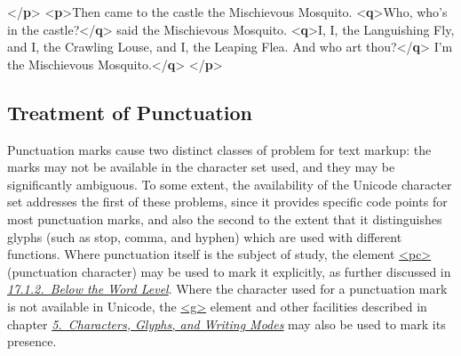 \begin{shaded}
{</\textbf{p}>}\mbox{}\newline 
{<\textbf{p}>}Then came to the castle the Mischievous Mosquito.\mbox{}\newline 
{<\textbf{q}>}Who, who's in the castle?{</\textbf{q}>} said the Mischievous\mbox{}\newline 
 Mosquito. {<\textbf{q}>}I, I, the Languishing Fly, and I, the\mbox{}\newline 
\hspace*{1em}\hspace*{1em} Crawling Louse, and I, the Leaping Flea. And who art\mbox{}\newline 
\hspace*{1em}\hspace*{1em} thou?{</\textbf{q}>}\mbox{}\newline 
{}I'm the Mischievous Mosquito.{</\textbf{q}>}\mbox{}\newline 
{</\textbf{p}>}\end{shaded}\egroup\par 
\subsection[{Treatment of Punctuation}]{Treatment of Punctuation}\label{COPU}\par
Punctuation marks cause two distinct classes of problem for text markup: the marks may not be available in the character set used, and they may be significantly ambiguous. To some extent, the availability of the Unicode character set addresses the first of these problems, since it provides specific code points for most punctuation marks, and also the second to the extent that it distinguishes glyphs (such as stop, comma, and hyphen) which are used with different functions.  Where punctuation itself is the subject of study, the element \hyperref[TEI.pc]{<pc>} (punctuation character) may be used to mark it explicitly, as further discussed in \textit{\hyperref[AIPC]{17.1.2.\ Below the Word Level}}. Where the character used for a punctuation mark is not available in Unicode, the \hyperref[TEI.g]{<g>} element and other facilities described in chapter \textit{\hyperref[WD]{5.\ Characters, Glyphs, and Writing Modes}} may also be used to mark its presence.
